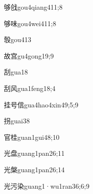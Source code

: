\begin{verbete}{够戗}{gou4qiang4}{11;8}
\end{verbete}

\begin{verbete}{够味}{gou4wei4}{11;8}
\end{verbete}

\begin{verbete}{彀}{gou4}{13}
\end{verbete}

\begin{verbete}{故宫}{gu4gong1}{9;9}
\end{verbete}

\begin{verbete}{刮}{gua1}{8}
\end{verbete}

\begin{verbete}{刮风}{gua1feng1}{8;4}
\end{verbete}

\begin{verbete}{挂号信}{gua4hao4xin4}{9;5;9}
\end{verbete}

\begin{verbete}{拐}{guai3}{8}
\end{verbete}

\begin{verbete}{官桂}{guan1gui4}{8;10}
\end{verbete}

\begin{verbete}{光盘}{guang1pan2}{6;11}
\end{verbete}

\begin{verbete}{光槃}{guang1pan2}{6;14}
\end{verbete}

\begin{verbete}{光污染}{guang1·wu1ran3}{6;6;9}
\end{verbete}

